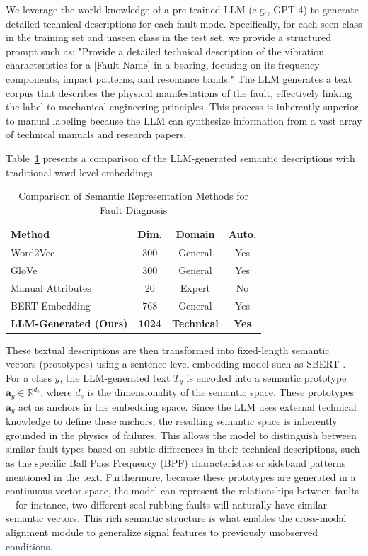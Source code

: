 \documentclass[journal]{IEEEtran}
\begin{document}
We leverage the world knowledge of a pre-trained LLM (e.g., GPT-4) to generate detailed technical descriptions for each fault mode. Specifically, for each seen class in the training set and unseen class in the test set, we provide a structured prompt such as: "Provide a detailed technical description of the vibration characteristics for a [Fault Name] in a bearing, focusing on its frequency components, impact patterns, and resonance bands." The LLM generates a text corpus that describes the physical manifestations of the fault, effectively linking the label to mechanical engineering principles. This process is inherently superior to manual labeling because the LLM can synthesize information from a vast array of technical manuals and research papers.

Table~\ref{tab:llm_semantics} presents a comparison of the LLM-generated semantic descriptions with traditional word-level embeddings.

\begin{table}[!t]
\centering
\caption{Comparison of Semantic Representation Methods for Fault Diagnosis}
\label{tab:llm_semantics}
\begin{tabular}{lccc}
\toprule
Method & Dim. & Domain & Auto. \\
\midrule
Word2Vec \cite{mikolov2013efficient} & 300 & General & Yes \\
GloVe & 300 & General & Yes \\
Manual Attributes \cite{lampert2014attribute} & 20 & Expert & No \\
BERT Embedding \cite{devlin2018bert} & 768 & General & Yes \\
\textbf{LLM-Generated (Ours)} & \textbf{1024} & \textbf{Technical} & \textbf{Yes} \\
\bottomrule
\end{tabular}
\end{table}

These textual descriptions are then transformed into fixed-length semantic vectors (prototypes) using a sentence-level embedding model such as SBERT \cite{reimers2019sentence}. For a class $y$, the LLM-generated text $T_y$ is encoded into a semantic prototype $\mathbf{a}_y \in \mathbb{R}^{d_s}$, where $d_s$ is the dimensionality of the semantic space. These prototypes $\mathbf{a}_y$ act as anchors in the embedding space. Since the LLM uses external technical knowledge to define these anchors, the resulting semantic space is inherently grounded in the physics of failures. This allows the model to distinguish between similar fault types based on subtle differences in their technical descriptions, such as the specific Ball Pass Frequency (BPF) characteristics or sideband patterns mentioned in the text. Furthermore, because these prototypes are generated in a continuous vector space, the model can represent the relationships between faults—for instance, two different seal-rubbing faults will naturally have similar semantic vectors. This rich semantic structure is what enables the cross-modal alignment module to generalize signal features to previously unobserved conditions.
\end{document}
